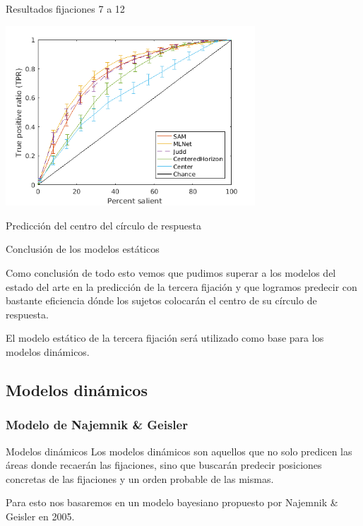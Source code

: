 \documentclass[compress]{beamer}
\begin{document}
\begin{frame}{Resultados fijaciones 7 a 12}
\begin{center}
\includegraphics[width=0.7\textwidth]{images/results_fix_7_to_12_all.png} 
\end{center}
\end{frame}


\begin{frame}{Predicción del centro del círculo de respuesta}
\begin{center}
\end{center}
\end{frame}

\begin{frame}{Conclusión de los modelos estáticos}

Como conclusión de todo esto vemos que pudimos superar a los modelos del estado del arte en la predicción de la tercera fijación y que logramos predecir con bastante eficiencia dónde los sujetos colocarán el centro de su círculo de respuesta.
\bigskip

El modelo estático de la tercera fijación será utilizado como base para los modelos dinámicos.
\end{frame}

\subsection{Modelos dinámicos}
\subsubsection{Modelo de Najemnik \& Geisler}
\begin{frame}{Modelos dinámicos}
Los modelos dinámicos son aquellos que no solo predicen las áreas donde
recaerán las fijaciones, sino que buscarán predecir posiciones concretas de las fijaciones y un orden probable de las mismas.

\bigskip

Para esto nos basaremos en un modelo bayesiano propuesto por Najemnik \& Geisler en 2005. 
\end{frame}
\end{document}
